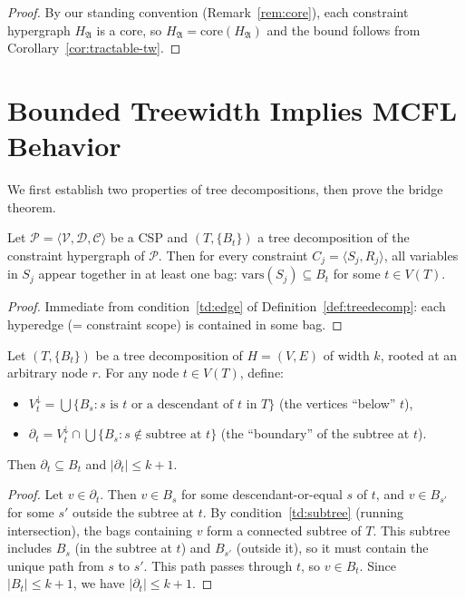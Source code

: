 \documentclass[runningheads]{llncs}
\begin{document}
\begin{proof}
By our standing convention (Remark~\ref{rem:core}), each constraint hypergraph $H_{\mathfrak{A}}$ is a core, so $H_{\mathfrak{A}} = \mathrm{core}(H_{\mathfrak{A}})$ and the bound follows from Corollary~\ref{cor:tractable-tw}.
\end{proof}

\section{Bounded Treewidth Implies MCFL Behavior}\label{sec:bridge}

We first establish two properties of tree decompositions, then prove the bridge theorem.

\begin{lemma}\label{lem:locality}
Let $\mathcal{P} = \langle \mathcal{V}, \mathcal{D}, \mathcal{C} \rangle$ be a CSP and $(T, \{B_t\})$ a tree decomposition of the constraint hypergraph of $\mathcal{P}$.
Then for every constraint $C_j = \langle S_j, R_j \rangle$, all variables in $S_j$ appear together in at least one bag: $\mathrm{vars}(S_j) \subseteq B_t$ for some $t \in V(T)$.
\end{lemma}

\begin{proof}
Immediate from condition~\ref{td:edge} of Definition~\ref{def:treedecomp}: each hyperedge (= constraint scope) is contained in some bag.
\end{proof}

\begin{lemma}\label{lem:boundary}
Let $(T, \{B_t\})$ be a tree decomposition of $H = (V,E)$ of width $k$, rooted at an arbitrary node $r$.
For any node $t \in V(T)$, define:
\begin{itemize}[nosep]
  \item $V^{\downarrow}_t = \bigcup \{B_s : s \text{ is $t$ or a descendant of $t$ in $T$}\}$ (the vertices ``below'' $t$),
  \item $\partial_t = V^{\downarrow}_t \cap \bigcup\{B_s : s \notin \text{subtree at } t\}$ (the ``boundary'' of the subtree at $t$).
\end{itemize}
Then $\partial_t \subseteq B_t$ and $|\partial_t| \leq k + 1$.
\end{lemma}

\begin{proof}
Let $v \in \partial_t$.
Then $v \in B_s$ for some descendant-or-equal $s$ of $t$, and $v \in B_{s'}$ for some $s'$ outside the subtree at $t$.
By condition~\ref{td:subtree} (running intersection), the bags containing $v$ form a connected subtree of $T$.
This subtree includes $B_s$ (in the subtree at $t$) and $B_{s'}$ (outside it), so it must contain the unique path from $s$ to $s'$.
This path passes through $t$, so $v \in B_t$.
Since $|B_t| \leq k + 1$, we have $|\partial_t| \leq k + 1$.
\end{proof}
\end{document}

